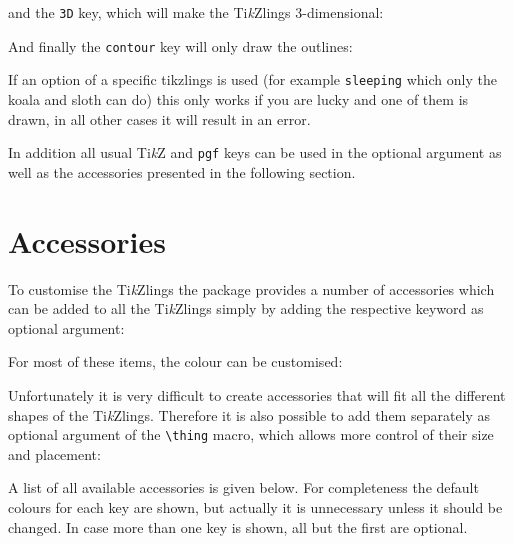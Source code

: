 \documentclass[parskip=half]{scrartcl}
\newcommand{\TikZ}{Ti\emph{k}Z\xspace}
\newcommand{\tikzlings}{Ti\emph{k}Zlings\xspace}
\begin{document}
and the \lstinline|3D| key, which will make the Ti\emph{k}Zlings 3-dimensional:
\begin{tcblisting}{}
\tikzling[3D]
\end{tcblisting}

And finally the \lstinline|contour| key will only draw the outlines:
\begin{tcblisting}{}
\tikzling[contour=black]
\end{tcblisting}

If an option of a specific tikzlings is used (for example \lstinline|sleeping| which only the koala and sloth can do) this only works if you are lucky and one of them is drawn, in all other cases it will result in an error. 

In addition all usual \TikZ and \lstinline|pgf| keys can be used in the optional argument as well as the accessories presented in the following section.

%
%
\clearpage
\section{Accessories}

To customise the \tikzlings the package provides a number of accessories which can be added to all the \tikzlings simply by adding the respective keyword as optional argument:

\begin{tcblisting}{}
\bear[hat]
\end{tcblisting}
 
For most of these items, the colour can be customised:

\begin{tcblisting}{}
\koala[crown=orange!50!yellow]
\end{tcblisting}

Unfortunately it is very difficult to create accessories that will fit all the different shapes of the \tikzlings. Therefore it is also possible to add them separately as optional argument of the \lstinline|\thing| macro, which allows more control of their size and placement:

\begin{tcblisting}{}
\owl
\thing[tophat,scale=1.5,yshift=-0.6cm,xshift=-0.05cm]
\end{tcblisting}

A list of all available accessories is given below. For completeness the default colours for each key are shown, but actually it is unnecessary unless it should be changed. In case more than one key is shown, all but the first are optional.
\end{document}
